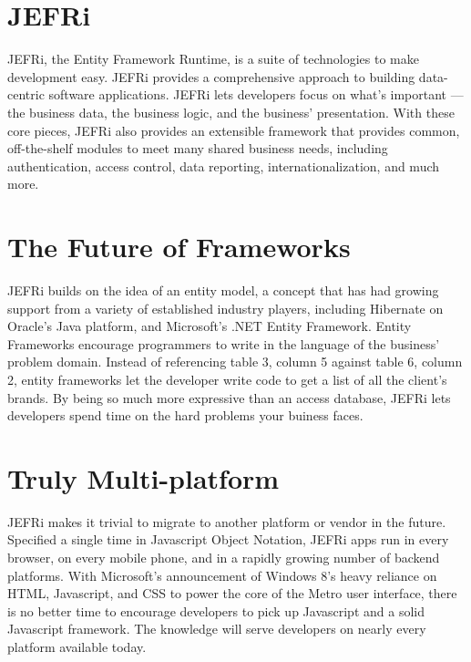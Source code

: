 \documentclass{article}
\begin{document}
\maketitle
\tableofcontents
\newpage
\linespread{1.6}

\section{JEFRi}
JEFRi, the Entity Framework Runtime, is a suite of technologies to
make development easy. JEFRi provides a comprehensive approach to building
data-centric software applications. JEFRi lets developers focus on what's important
--- the business data, the business logic, and the business' presentation. With
these core pieces, JEFRi also provides an extensible framework that provides
common, off-the-shelf modules to meet many shared business needs, including
authentication, access control, data reporting, internationalization, and much
more.

\section{The Future of Frameworks}
JEFRi builds on the idea of an entity model, a concept that has had growing
support from a variety of established industry players, including Hibernate on
Oracle's Java platform, and Microsoft's .NET Entity Framework. Entity Frameworks
encourage programmers to write in the language of the business' problem domain.
Instead of referencing table 3, column 5 against table 6, column 2, entity
frameworks let the developer write code to get a list of all the client's
brands. By being so much more expressive than an access database, JEFRi lets
developers spend time on the hard problems your buiness faces.

\section{Truly Multi-platform}
JEFRi makes it trivial to migrate to another platform or vendor in the future.
Specified a single time in Javascript Object Notation, JEFRi apps run in every
browser, on every mobile phone, and in a rapidly growing number of backend
platforms. With Microsoft's announcement of Windows 8's heavy reliance on
HTML, Javascript, and CSS to power the core of the Metro user interface, there
is no better time to encourage developers to pick up Javascript and a solid
Javascript framework. The knowledge will serve developers on nearly every
platform available today.
\end{document}

